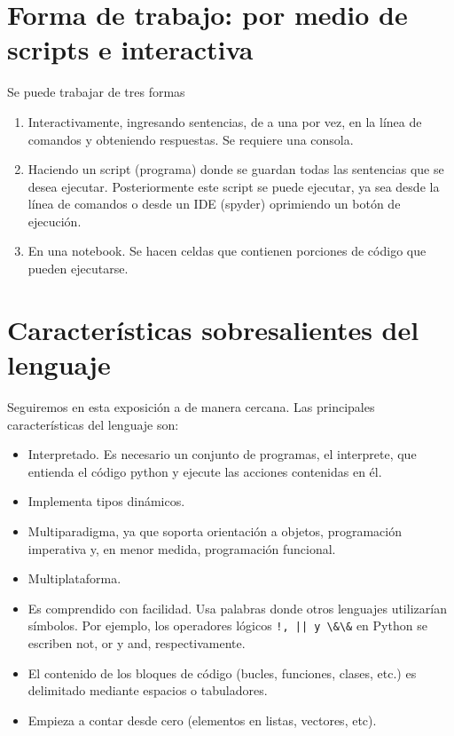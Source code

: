 \section{Forma de trabajo: por medio de scripts e interactiva}


Se puede trabajar de tres formas

\begin{enumerate}
\item Interactivamente, ingresando sentencias, de a una por vez, en la línea de comandos y obteniendo respuestas. Se requiere una consola.

\item Haciendo un script (programa) donde se guardan todas las sentencias que se desea ejecutar. Posteriormente este script se puede ejecutar, ya sea desde la línea de comandos o desde un IDE (spyder) oprimiendo un botón de ejecución.

\item En una notebook. Se hacen celdas que contienen porciones de código que pueden ejecutarse.

\end{enumerate}





\section{Características sobresalientes del lenguaje}

Seguiremos en esta exposición a \cite{wiki_python} de manera cercana. 
Las principales características del lenguaje son:

\normalmarginpar
\begin{itemize}
\item Interpretado. Es necesario un conjunto de programas, 
el interprete, que entienda el código python y ejecute las acciones contenidas en él.
\item Implementa  tipos dinámicos.
\item  Multiparadigma, ya que soporta orientación a objetos, programación imperativa y, en menor medida, programación funcional.
\item Multiplataforma.

\item Es comprendido  con facilidad. Usa  palabras donde otros lenguajes utilizarían símbolos. Por ejemplo, los operadores lógicos \verb~!, || y \&\&~ en Python se escriben not, or y and, respectivamente.


\item  El contenido de los bloques de código (bucles, funciones, clases, etc.) es delimitado mediante espacios o tabuladores.

\item Empieza a contar desde cero (elementos en listas, vectores, etc).



\end{itemize}





